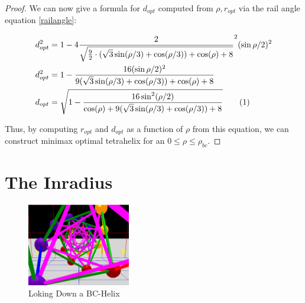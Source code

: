 \documentclass[11pt]{article}
\newcommand\numberthis{\addtocounter{equation}{1}\tag{\theequation}}
\begin{document}
\begin{proof}
We can now give a formula for $ d_{opt} $ computed from $\rho, r_{opt}$ via the rail angle equation \eqref{railangle}:

\begin{align*}
  d_{opt}^2 &= 1 - 4 \frac{2}{\sqrt{\frac{9}{2} \cdot ( \sqrt{3} \sin(\rho/3) + \cos(\rho/3)) + \cos(\rho)+ 8 }}^2 (\sin{ \rho / 2})^2   \\
  d_{opt}^2 &= 1 - \frac{16(\sin{ \rho / 2})^2}{9 ( \sqrt{3} \sin(\rho/3) + \cos(\rho/3)) + \cos(\rho)+ 8 }    \\
    d_{opt} &= \sqrt{1 - \frac{16 \sin^2(\rho / 2) }{ \cos(\rho) + 9( \sqrt{3} \sin(\rho/3) + \cos(\rho/3)) + 8 }}    \numberthis  \label{dopt}  \\      
\end{align*}

Thus, by computing $r_{opt}$  and $d_{opt}$ as a function of $\rho$ from this equation, we can construct minimax optimal tetrahelix for an $0 \leq \rho \leq \rho_{bc}$.
\end{proof}

\section{The Inradius}

\begin{figure}[H]
     \centering
     \includegraphics[width=0.4\textwidth]{figures/AxialView.png}
     \caption{Loking Down a BC-Helix}
  \label{axialview}     
\end{figure}
\end{document}
